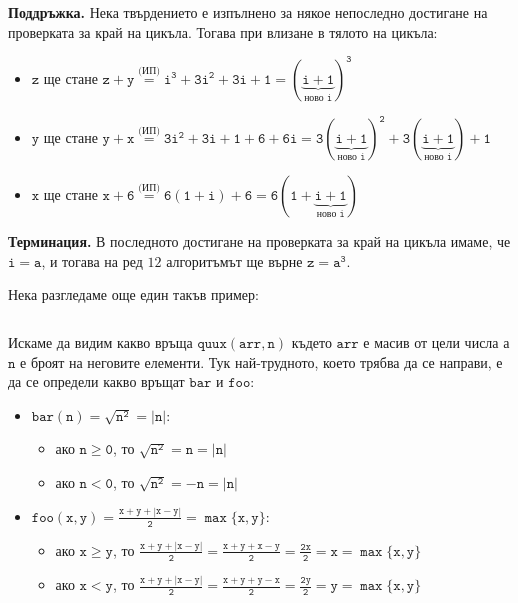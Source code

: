 \documentclass{article}
\theoremstyle{definition}
\theoremstyle{plain}
\theoremstyle{remark}
\theoremstyle{definition}
\begin{document}
\textbf{Поддръжка.}
Нека твърдението е изпълнено за някое непоследно достигане на проверката за край на цикъла.
Тогава при влизане в тялото на цикъла:
\begin{itemize}
    \item $\mathtt{z \text{ ще стане } z + y \stackrel{\text{(ИП)}}{=} i^3 + 3i^2 + 3i + 1 = (\underbrace{\mathtt{i + 1}}_{\text{ново } i})^3}$
    \item $\mathtt{y \text{ ще стане } y + x \stackrel{\text{(ИП)}}{=} 3i^2 + 3i + 1 + 6 + 6i = 3(\underbrace{\mathtt{i + 1}}_{\text{ново } i})^2 + 3(\underbrace{\mathtt{i + 1}}_{\text{ново } i}) + 1}$
    \item $\mathtt{x \text{ ще стане } x + 6 \stackrel{\text{(ИП)}}{=} 6(1 + i) + 6 = 6(1 + \underbrace{\mathtt{i + 1}}_{\text{ново } i})}$
\end{itemize}

\textbf{Терминация.}
В последното достигане на проверката за край на цикъла имаме, че $\mathtt{i = a}$, и тогава на ред $12$ алгоритъмът ще върне $\mathtt{z = a^3}$.

Нека разгледаме още един такъв пример:
\inputminted[linenos]{c++}{algorithms/quux.cpp}

Искаме да видим какво връща $\mathtt{quux(arr, n)}$ където $\mathtt{arr}$ е масив от цели числа а $\mathtt{n}$ е броят на неговите елементи.
Тук най-трудното, което трябва да се направи, е да се определи какво връщат $\mathtt{bar}$ и $\mathtt{foo}$:
\begin{itemize}
    \item $\mathtt{bar(n) = \sqrt{n ^ 2} = | n |}$:
          \begin{itemize}
              \item ако $\mathtt{n \geq 0}$, то $\mathtt{\sqrt{n^2} = n = | n |}$
              \item ако $\mathtt{n < 0}$, то $\mathtt{\sqrt{n^2} = -n = | n |}$
          \end{itemize}
    \item $\mathtt{foo(x, y) = \frac{x + y + |x - y|}{2}  = \max\{ x, y \}}$:
          \begin{itemize}
              \item ако $\mathtt{x \geq y}$, то $\mathtt{\frac{x + y + |x - y|}{2} = \frac{x + y + x - y}{2} = \frac{2x}{2} = x = \max\{ x, y \}}$
              \item ако $\mathtt{x < y}$, то $\mathtt{\frac{x + y + |x - y|}{2} = \frac{x + y + y - x}{2} = \frac{2y}{2} = y = \max\{ x, y \}}$
          \end{itemize}
\end{itemize}
\end{document}
